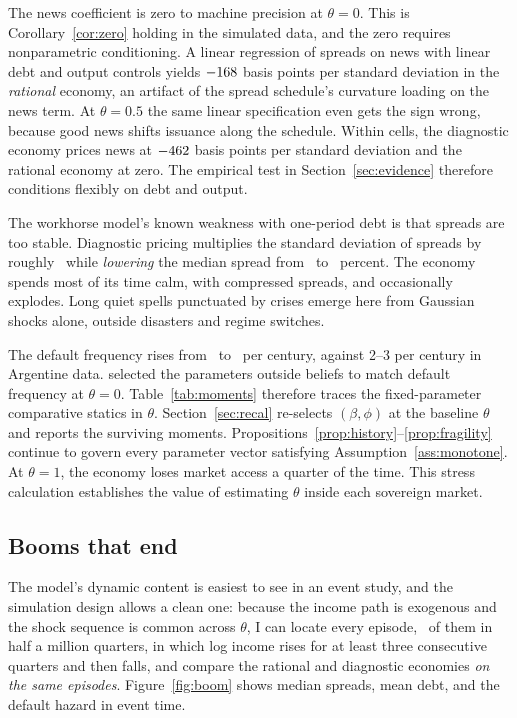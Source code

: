 \documentclass[11pt]{article}
\theoremstyle{definition}
\begin{document}
The news coefficient is zero to machine precision at $\theta = 0$. This is Corollary~\ref{cor:zero} holding in the simulated data, and the zero requires nonparametric conditioning. A linear regression of spreads on news with linear debt and output controls yields $-168$ basis points per standard deviation in the \emph{rational} economy, an artifact of the spread schedule's curvature loading on the news term. At $\theta = 0.5$ the same linear specification even gets the sign wrong, because good news shifts issuance along the schedule. Within cells, the diagnostic economy prices news at $-462$ basis points per standard deviation and the rational economy at zero. The empirical test in Section~\ref{sec:evidence} therefore conditions flexibly on debt and output.

The workhorse model's known weakness with one-period debt is that spreads are too stable. Diagnostic pricing multiplies the standard deviation of spreads by roughly \SprSdRatio\ while \emph{lowering} the median spread from \SprMedRE\ to \SprMedDiag\ percent. The economy spends most of its time calm, with compressed spreads, and occasionally explodes. Long quiet spells punctuated by crises emerge here from Gaussian shocks alone, outside disasters and regime switches.

The default frequency rises from \DefFreqRE\ to \DefFreqDiag\ per century, against 2--3 per century in Argentine data. \citet{Arellano2008} selected the parameters outside beliefs to match default frequency at $\theta=0$. Table~\ref{tab:moments} therefore traces the fixed-parameter comparative statics in $\theta$. Section~\ref{sec:recal} re-selects $(\beta,\phi)$ at the baseline $\theta$ and reports the surviving moments. Propositions~\ref{prop:history}--\ref{prop:fragility} continue to govern every parameter vector satisfying Assumption~\ref{ass:monotone}. At $\theta=1$, the economy loses market access a quarter of the time. This stress calculation establishes the value of estimating $\theta$ inside each sovereign market.

\subsection{Booms that end}

The model's dynamic content is easiest to see in an event study, and the simulation design allows a clean one: because the income path is exogenous and the shock sequence is common across $\theta$, I can locate every episode, \EventsN\ of them in half a million quarters, in which log income rises for at least three consecutive quarters and then falls, and compare the rational and diagnostic economies \emph{on the same episodes}. Figure~\ref{fig:boom} shows median spreads, mean debt, and the default hazard in event time.
\end{document}

